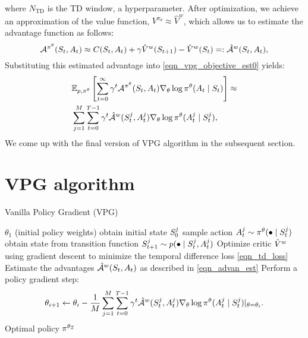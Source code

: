 \documentclass[12pt,twoside]{../../mitthesis}
\begin{document}
where $N_{\text{TD}}$ is the TD window, a hyperparameter.
After optimization, we achieve an approximation of the value function, $V^{\pi_{\theta}} \approx \hat{V}^w$, which allows us to estimate the advantage function as follows: 
\begin{equation}
    \label{eqn_advan_est}
    \Advan^{\policy^{\theta}}(\State_t, \Action_t) \approx \Cost(\State_t, \Action_t) + \gamma \hat\Value^w(\State_{t+1}) - \hat\Value^w(\State_t) =: \hat\Advan^{w}(\State_t, \Action_t) ,
\end{equation}
Substituting this estimated advantage into \eqref{eqn_vpg_objective_est0} yields:
\begin{equation}
    \label{eqn_vpg_objective_est}
    \begin{aligned}
    &\E[\transit, \policy^{\theta}]{ \sum_{t = 0}^{\infty}\gamma^t\Advan^{\policy^{\theta}} (\State_t, \Action_t)\nabla_{\theta} \log \policy^{\theta}(\Action_t \mid \State_t)} \approx \\ 
    &\sum_{j = 1}^M \sum_{t=0}^{T-1} \gamma ^ t \hat\Advan^{w}(\State_t^j, \Action_t^j) \nabla_{\theta} \log \policy^{\theta}(\Action_t^j \mid \State_t^j),
    \end{aligned}
\end{equation}
We come up with the final version of VPG algorithm in the subsequent section.
\section*{VPG algorithm}
\begin{algorithm}
    \caption{Vanilla Policy Gradient (VPG)}
    \label{alg:my-alg}
    \begin{algorithmic}
     $\theta_1$ (initial policy weights)
            \STATE obtain initial state $S_0^{j}$
                \STATE sample action $A_t^j \sim \pi^{\theta}(\bullet \mid S_t^{j})$
                \STATE obtain state from transition function $S_{t+1}^j \sim p(\bullet \mid S_t^j, A_t^j)$
            \ENDFOR
        \ENDFOR
        \STATE Optimize critic $\hat{V}^{w}$ using gradient descent to minimize the temporal difference loss \eqref{eqn_td_loss}
        \STATE Estimate the advantages $\hat{\mathcal A}^{w}(S_t, A_t)$ as described in \eqref{eqn_advan_est}  
        \STATE Perform a policy gradient step:
        $$
            \theta_{i+1} \leftarrow \theta_i - \frac{1}{M} \sum_{j = 1}^M \sum_{t=0}^{T-1} \gamma ^ t \hat{\mathcal A}^{w}(S_t^j, A_t^j) \nabla_{\theta} \log \pi^{\theta}(A_t^j \mid S_t^j)\rvert_{\theta = \theta_i}.
        $$
    \ENDFOR
    \STATE \RETURN Optimal policy $\pi^{\theta_{\mathcal I}}$
    \end{algorithmic}
\end{algorithm}
\end{document}

